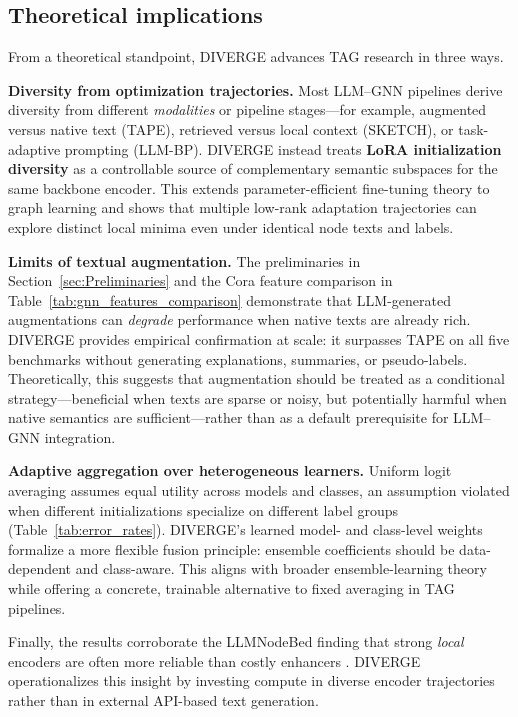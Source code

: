 \documentclass[a4paper,fleqn]{cas-sc}
\begin{document}
\subsection{Theoretical implications}

From a theoretical standpoint, DIVERGE advances TAG research in three ways.

\textbf{Diversity from optimization trajectories.} Most LLM--GNN pipelines derive diversity from different \emph{modalities} or pipeline stages---for example, augmented versus native text (TAPE), retrieved versus local context (SKETCH), or task-adaptive prompting (LLM-BP). DIVERGE instead treats \textbf{LoRA initialization diversity} as a controllable source of complementary semantic subspaces for the same backbone encoder. This extends parameter-efficient fine-tuning theory \citep{Hu2021LoRA, meng2024pissa, paischer2024eva} to graph learning and shows that multiple low-rank adaptation trajectories can explore distinct local minima even under identical node texts and labels.

\textbf{Limits of textual augmentation.} The preliminaries in Section~\ref{sec:Preliminaries} and the Cora feature comparison in Table~\ref{tab:gnn_features_comparison} demonstrate that LLM-generated augmentations can \emph{degrade} performance when native texts are already rich. DIVERGE provides empirical confirmation at scale: it surpasses TAPE on all five benchmarks without generating explanations, summaries, or pseudo-labels. Theoretically, this suggests that augmentation should be treated as a conditional strategy---beneficial when texts are sparse or noisy, but potentially harmful when native semantics are sufficient---rather than as a default prerequisite for LLM--GNN integration.

\textbf{Adaptive aggregation over heterogeneous learners.} Uniform logit averaging assumes equal utility across models and classes, an assumption violated when different initializations specialize on different label groups (Table~\ref{tab:error_rates}). DIVERGE's learned model- and class-level weights formalize a more flexible fusion principle: ensemble coefficients should be data-dependent and class-aware. This aligns with broader ensemble-learning theory while offering a concrete, trainable alternative to fixed averaging in TAG pipelines.

Finally, the results corroborate the LLMNodeBed finding that strong \emph{local} encoders are often more reliable than costly enhancers \citep{Wu2025LLMNode}. DIVERGE operationalizes this insight by investing compute in diverse encoder trajectories rather than in external API-based text generation.
\end{document}

